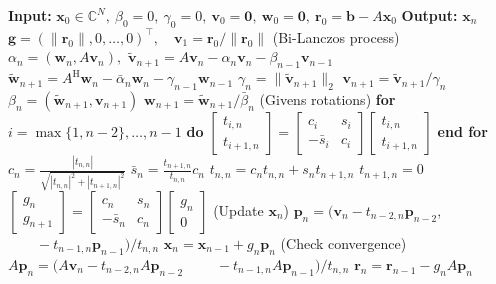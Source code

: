 \begin{algorithm}[H]\caption{{The QMR method}}\label{alg:qmr}\begin{algorithmic}[1]
\Statex\textbf{Input:} $\bm x_0\in\mathbb C^N,\ \beta_0=0,\ \gamma_0=0,\ \bm v_0=\bm0,\ \bm w_0=\bm0,\ \bm r_0=\bm b-A\bm x_0$
\Statex\textbf{Output:} $\bm x_n$
\State $\bm g=(\|\bm r_0\|,0,\ldots,0)^{\top},\quad\bm v_1=\bm r_0/\|\bm r_0\|$
\State ({Bi-Lanczos process})
\State $\alpha_n=(\bm w_n,A\bm v_n),$
\State $\widetilde{\bm v}_{n+1}=A\bm v_n-\alpha_n\bm v_n-\beta_{n-1}\bm v_{n-1}$
\State $\widetilde{\bm w}_{n+1}=A^{\mathrm H}\bm w_n-\bar\alpha_n\bm w_n-\gamma_{n-1}\bm w_{n-1}$
\State $\gamma_n=\|\widetilde{\bm v}_{n+1}\|_2$
\State $\bm v_{n+1}=\widetilde{\bm v}_{n+1}/\gamma_n$
\State $\beta_n=(\widetilde{\bm w}_{n+1},\bm v_{n+1})$
\State $\bm w_{n+1}=\widetilde{\bm w}_{n+1}/\bar\beta_n$
\State (Givens {rotations})
\State \textbf{for} $i=\max\{1,n-2\},\ldots,n-1$ \textbf{do}
\State $\begin{bmatrix}t_{i,n}\\t_{i+1,n}\end{bmatrix}=\begin{bmatrix}c_i&s_i\\-\bar s_i&c_i\end{bmatrix}\begin{bmatrix}t_{i,n}\\t_{i+1,n}\end{bmatrix}$
\State \textbf{end for}
\State $c_n=\frac{|t_{n,n}|}{\sqrt{|t_{n,n}|^2+|t_{n+1,n}|^2}}$
\State $\bar s_n=\frac{t_{n+1,n}}{t_{n,n}}c_n$
\State $t_{n,n}=c_nt_{n,n}+s_nt_{n+1,n}$
\State $t_{n+1,n}=0$
\State $\begin{bmatrix}g_n\\g_{n+1}\end{bmatrix}=\begin{bmatrix}c_n&s_n\\-\bar s_n&c_n\end{bmatrix}\begin{bmatrix}g_n\\0\end{bmatrix}$
\State ({Update} $\bm x_n$)
\State $\bm p_n=(\bm v_n-t_{n-2,n}\bm p_{n-2},$
\State $\qquad-t_{n-1,n}\bm p_{n-1})/t_{n,n}$
\State $\bm x_n=\bm x_{n-1}+g_n\bm p_n$
\State ({Check convergence})
\State $A\bm p_n=(A\bm v_n-t_{n-2,n}A\bm p_{n-2}$
\State $\qquad-t_{n-1,n}A\bm p_{n-1})/t_{n,n}$
\State $\bm r_n=\bm r_{n-1}-g_nA\bm p_n$
\EndFor\end{algorithmic}\end{algorithm}
